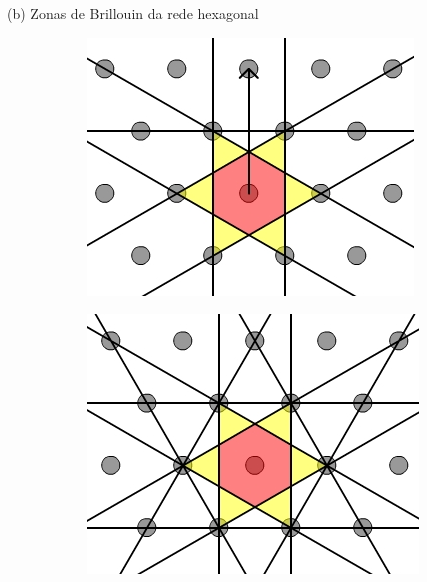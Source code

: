 \documentclass[aspectratio=169]{beamer}
\begin{document}


\begin{frame}{(b) Zonas de Brillouin da rede hexagonal}

\begin{figure}[H]
\centering
\begin{subfigure}{.45\textwidth}
  \centering
  \includegraphics[width=\linewidth]{fig/hexbz_construct-5.png}
\end{subfigure}%
\quad \quad
\begin{subfigure}{.45\textwidth}
  \centering
  \includegraphics[width=\linewidth]{fig/hexbz_construct-6.png}
\end{subfigure}
\end{figure}

\end{frame}
\end{document}
